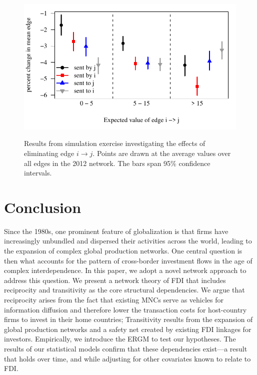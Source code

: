\documentclass[reqno,onecolumn,letterpaper,12pt]{article}
\begin{document}
\begin{figure}[!h]
\centering
\includegraphics[scale=.85]{./figures/contagion_simulation_results} \vspace{-.5cm}\\
\caption{\label{fig:contagion} Results from simulation exercise investigating the effects of eliminating edge $i \rightarrow j$. Points are drawn at the average values over all edges in the 2012 network. The bars span 95\% confidence intervals.}
\end{figure}










\section{Conclusion}

Since the 1980s, one prominent feature of globalization is that firms have increasingly unbundled and dispersed their activities across the world, leading to the expansion of complex global production networks. One central question is then what accounts for the pattern of cross-border investment flows in the age of complex interdependence. In this paper, we adopt a novel network approach to address this question. %
We present a network theory of FDI that includes reciprocity and transitivity as the core structural dependencies. We argue that reciprocity arises from the fact %
that existing MNCs serve as vehicles for information diffusion and therefore lower the transaction costs for host-country firms to invest in their home countries; Transitivity results from the expansion of global production networks and a safety net created by existing FDI linkages for investors. %
Empirically, we introduce the ERGM to test our hypotheses. The results of our statistical models confirm that these dependencies exist---a result that holds over time, and while adjusting for other covariates known to relate to FDI.
\end{document}
